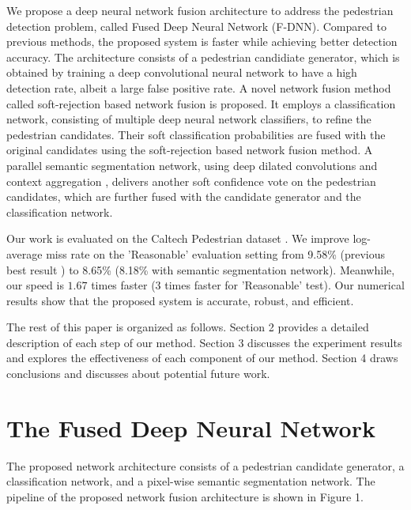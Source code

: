\documentclass[10pt,letterpaper]{article}
\begin{document}
We propose a deep neural network fusion architecture to address the pedestrian detection problem, called Fused Deep Neural Network (F-DNN). Compared to previous methods, the proposed system is faster while achieving better detection accuracy. The architecture consists of a pedestrian candidiate generator, which is obtained by training a deep convolutional neural network to have a high detection rate, albeit a large false positive rate. A novel network fusion method called soft-rejection based network fusion is proposed. It employs a classification network, consisting of multiple deep neural network classifiers, to refine the pedestrian candidates. Their soft classification probabilities are fused with the original candidates using the soft-rejection based network fusion method. A parallel semantic segmentation network, using deep dilated convolutions and context aggregation \cite{sspaper}, delivers another soft confidence vote on the pedestrian candidates, which are further fused with the candidate generator and the classification network.   

Our work is evaluated on the Caltech Pedestrian dataset \cite{caltech}. We improve log-average miss rate on the 'Reasonable' evaluation setting from 9.58\% (previous best result \cite{rpn}) to 8.65\% (8.18\% with semantic segmentation network). Meanwhile, our speed is $1.67$ times faster ($3$ times faster for 'Reasonable' test). Our numerical results show that the proposed system is accurate, robust, and efficient. 

The rest of this paper is organized as follows. Section 2 provides a detailed description of each step of our method. Section 3 discusses the experiment results and explores the effectiveness of each component of our method. Section 4 draws conclusions and discusses about potential future work.


\section{The Fused Deep Neural Network}
The proposed network architecture consists of a pedestrian candidate generator, a classification network, and a pixel-wise semantic segmentation network. The pipeline of the proposed network fusion architecture is shown in Figure 1.
\end{document}
